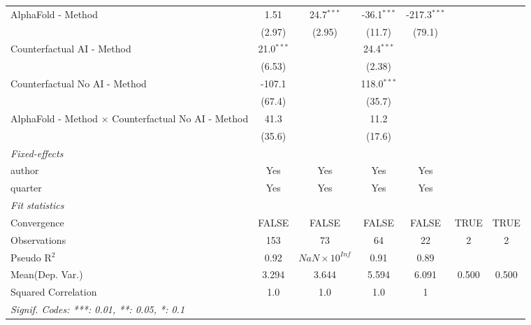 \begin{tabular}{lcccccc}
   AlphaFold - Method                                         & 1.51         & 24.7$^{***}$          & -36.1$^{***}$ & -217.3$^{***}$ &      &   \\   
                                                              & (2.97)       & (2.95)                & (11.7)        & (79.1)         &      &   \\   
   Counterfactual AI - Method                                 & 21.0$^{***}$ &                       & 24.4$^{***}$  &                &      &   \\   
                                                              & (6.53)       &                       & (2.38)        &                &      &   \\   
   Counterfactual No AI - Method                              & -107.1       &                       & 118.0$^{***}$ &                &      &   \\   
                                                              & (67.4)       &                       & (35.7)        &                &      &   \\   
   AlphaFold - Method $\times$ Counterfactual No AI - Method  & 41.3         &                       & 11.2          &                &      &   \\   
                                                              & (35.6)       &                       & (17.6)        &                &      &   \\   
   \midrule
   \emph{Fixed-effects}\\
   author                                                     & Yes          & Yes                   & Yes           & Yes            &      & \\  
   quarter                                                    & Yes          & Yes                   & Yes           & Yes            &      & \\  
   \midrule
   \emph{Fit statistics}\\
   Convergence                                                &FALSE         & FALSE                 & FALSE         & FALSE          & TRUE & TRUE\\  
   Observations                                               & 153          & 73                    & 64            & 22             & 2    & 2\\  
   Pseudo R$^2$                                               & 0.92         & $NaN\times 10^{Inf}$  & 0.91          & 0.89           &      & \\  
Mean(Dep. Var.) & 3.294 & 3.644 & 5.594 & 6.091 & 0.500 & 0.500 \\
   Squared Correlation                                        & 1.0          & 1.0                   & 1.0           & 1              &      & \\  
   \midrule \midrule
   \multicolumn{7}{l}{\emph{Signif. Codes: ***: 0.01, **: 0.05, *: 0.1}}\\
\end{tabular}
\par\endgroup
